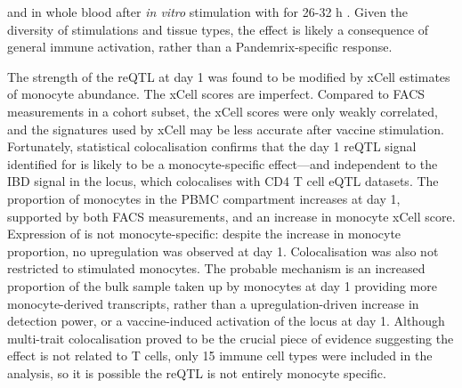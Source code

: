 and in whole blood after \textit{in vitro} stimulation with  for 26-32 h \autocite{manry2017DecipheringGeneticControl}.
%
Given the diversity of stimulations and tissue types, the effect is likely a consequence of general immune activation, rather than a Pandemrix-specific response.

%
The strength of the  \gls{reQTL} at day 1 was found to be modified by xCell estimates of monocyte abundance. 
%
The xCell scores are imperfect.
Compared to FACS measurements in a cohort subset, the xCell scores were only weakly correlated, and the signatures used by xCell may be less accurate after vaccine stimulation.
Fortunately, statistical colocalisation confirms that the day 1 reQTL signal identified for  is likely to be a monocyte-specific effect---and independent to the IBD signal in the locus, which colocalises with CD4 T cell eQTL datasets.
The proportion of monocytes in the \gls{PBMC} compartment increases at day 1, supported by both FACS \autocite{sobolev2016AdjuvantedInfluenzaH1N1Vaccination} measurements, and an increase in monocyte xCell score.
Expression of  is not monocyte-specific: despite the increase in monocyte proportion, no upregulation was observed at day 1.
Colocalisation was also not restricted to stimulated monocytes.
The probable mechanism is an increased proportion of the bulk sample taken up by monocytes at day 1 providing more monocyte-derived  transcripts,
rather than a upregulation-driven increase in detection power,
or a vaccine-induced activation of the locus at day 1.
Although multi-trait colocalisation proved to be the crucial piece of evidence suggesting the effect is not related to T cells,
only 15 immune cell types were included in the analysis, so it is possible the reQTL is not entirely monocyte specific.

